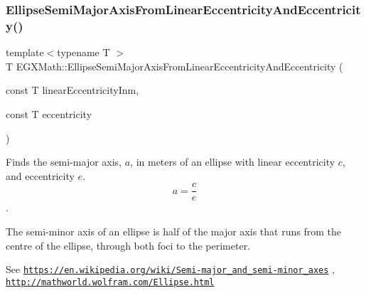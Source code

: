 \mbox{\label{group___e_g_x_math-_geometry-2_d-_ellipse-_semi_major_axis_gaf013b5a5e305696948669e348c7dd1c1}} 
\subsubsection{\texorpdfstring{Ellipse\+Semi\+Major\+Axis\+From\+Linear\+Eccentricity\+And\+Eccentricity()}{EllipseSemiMajorAxisFromLinearEccentricityAndEccentricity()}}
{\footnotesize\ttfamily template$<$typename T $>$ \\
T E\+G\+X\+Math\+::\+Ellipse\+Semi\+Major\+Axis\+From\+Linear\+Eccentricity\+And\+Eccentricity (\begin{DoxyParamCaption}\item[{const T}]{linear\+Eccentricity\+Inm,  }\item[{const T}]{eccentricity }\end{DoxyParamCaption})}



Finds the semi-\/major axis, $a$, in meters of an ellipse with linear eccentricity $c$, and eccentricity $e$. \[ a=\dfrac{c}{e} \]. 

The semi-\/minor axis of an ellipse is half of the major axis that runs from the centre of the ellipse, through both foci to the perimeter.

See \href{https://en.wikipedia.org/wiki/Semi-major_and_semi-minor_axes}{\tt https\+://en.\+wikipedia.\+org/wiki/\+Semi-\/major\+\_\+and\+\_\+semi-\/minor\+\_\+axes} , \href{http://mathworld.wolfram.com/Ellipse.html}{\tt http\+://mathworld.\+wolfram.\+com/\+Ellipse.\+html}


